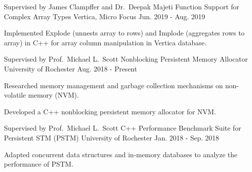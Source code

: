 

\begin{cventries}

  \cventry
    {Supervised by James Clampffer and Dr.\ Deepak Majeti} %
    {Function Support for Complex Array Types} %
    {Vertica, Micro Focus} %
    {Jun. 2019 - Aug. 2019} %
    {
      \begin{cvitems} %
        \item {Implemented Explode (unnests array to rows) and Implode (aggregates rows to array) in C++ for array column manipulation in Vertica database.}
      \end{cvitems}
    }

  \cventry
    {Supervised by Prof.\ Michael L.\ Scott} %
    {Nonblocking Persistent Memory Allocator} %
    {University of Rochester} %
    {Aug. 2018 - Present} %
    {
      \begin{cvitems} %
        \item {Researched memory management and garbage collection mechanisms on non-volatile memory (NVM).}
        \item {Developed a C++ nonblocking persistent memory allocator for NVM.}
      \end{cvitems}
	  }

  \cventry
    {Supervised by Prof.\ Michael L.\ Scott} %
    {C++ Performance Benchmark Suite for Persistent STM (PSTM)} %
    {University of Rochester} %
    {Jan. 2018 - Sep. 2018} %
    {
      \begin{cvitems} %
        \item {Adapted concurrent data structures and in-memory databases to analyze the performance of PSTM.}
      \end{cvitems}
    }


\end{cventries}
